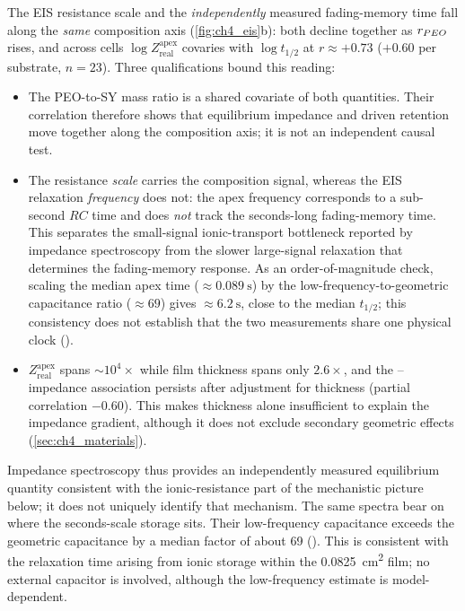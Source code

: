 \documentclass[12pt, twoside]{report}
\begin{document}
The EIS resistance scale and the \emph{independently} measured fading-memory time fall along the \emph{same} composition axis (\cref{fig:ch4_eis}b): both decline together as \(r_{PEO{}}\) rises, and across cells \(\log Z_{\mathrm{real}}^{\mathrm{apex}}\) covaries with \(\log t_{1/2}\) at \(r\approx+0.73\) (\(+0.60\) per substrate, \(n=23\)). Three qualifications bound this reading:
\begin{itemize}
  \item The PEO-to-SY mass ratio is a shared covariate of both quantities. Their correlation therefore shows that equilibrium impedance and driven retention move together along the composition axis; it is not an independent causal test.
  \item The resistance \emph{scale} carries the composition signal, whereas the EIS relaxation \emph{frequency} does not: the apex frequency corresponds to a sub-second \(RC\) time and does \emph{not} track the seconds-long fading-memory time. This separates the small-signal ionic-transport bottleneck reported by impedance spectroscopy from the slower large-signal relaxation that determines the fading-memory response. As an order-of-magnitude check, scaling the median apex time (\(\approx\SI{0.089}{\second}\)) by the low-frequency-to-geometric capacitance ratio (\(\approx69\)) gives \(\approx\SI{6.2}{\second}\), close to the median \(t_{1/2}\); this consistency does not establish that the two measurements share one physical clock ().
  \item \(Z_{\mathrm{real}}^{\mathrm{apex}}\) spans \(\sim\!10^{4}\times\) while film thickness spans only \(2.6\times\), and the \PEO{}--impedance association persists after adjustment for thickness (partial correlation \(-0.60\)). This makes thickness alone insufficient to explain the impedance gradient, although it does not exclude secondary geometric effects (\cref{sec:ch4_materials}).
\end{itemize}
Impedance spectroscopy thus provides an independently measured equilibrium quantity consistent with the ionic-resistance part of the mechanistic picture below; it does not uniquely identify that mechanism. The same spectra bear on where the seconds-scale storage sits. Their low-frequency capacitance exceeds the geometric capacitance by a median factor of about \num{69} (). This is consistent with the relaxation time arising from ionic storage within the \SI{0.0825}{\square\centi\metre} film; no external capacitor is involved, although the low-frequency estimate is model-dependent.
\end{document}
